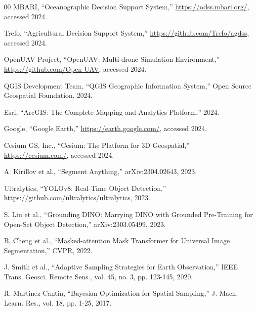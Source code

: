 \documentclass[conference]{IEEEtran}
\begin{document}
\begin{thebibliography}{00}
 MBARI, ``Oceanographic Decision Support System,'' \url{https://odss.mbari.org/}, accessed 2024.

 Trefo, ``Agricultural Decision Support System,'' \url{https://github.com/Trefo/agdss}, accessed 2024.

 OpenUAV Project, ``OpenUAV: Multi-drone Simulation Environment,'' \url{https://github.com/Open-UAV}, accessed 2024.

 QGIS Development Team, ``QGIS Geographic Information System,'' Open Source Geospatial Foundation, 2024.

 Esri, ``ArcGIS: The Complete Mapping and Analytics Platform,'' 2024.

 Google, ``Google Earth,'' \url{https://earth.google.com/}, accessed 2024.

 Cesium GS, Inc., ``Cesium: The Platform for 3D Geospatial,'' \url{https://cesium.com/}, accessed 2024.

 A. Kirillov et al., ``Segment Anything,'' arXiv:2304.02643, 2023.

 Ultralytics, ``YOLOv8: Real-Time Object Detection,'' \url{https://github.com/ultralytics/ultralytics}, 2023.

 S. Liu et al., ``Grounding DINO: Marrying DINO with Grounded Pre-Training for Open-Set Object Detection,'' arXiv:2303.05499, 2023.

 B. Cheng et al., ``Masked-attention Mask Transformer for Universal Image Segmentation,'' CVPR, 2022.

 J. Smith et al., ``Adaptive Sampling Strategies for Earth Observation,'' IEEE Trans. Geosci. Remote Sens., vol. 45, no. 3, pp. 123-145, 2020.

 R. Martinez-Cantin, ``Bayesian Optimization for Spatial Sampling,'' J. Mach. Learn. Res., vol. 18, pp. 1-25, 2017.
\end{thebibliography}
\end{document}
